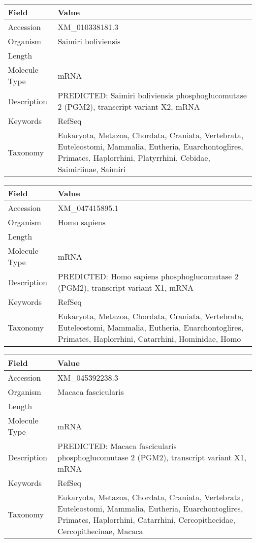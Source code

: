 \documentclass[10pt]{article}
\begin{document}
{\footnotesize
\begin{longtable}{>{\raggedright\arraybackslash}p{4.5cm} >{\raggedright\arraybackslash}p{11.5cm}}
\textbf{Field} & \textbf{Value} \\
\hline
Accession & XM\_010338181.3 \\
Organism & Saimiri boliviensis \\
Length & 2692 \\
Molecule Type & mRNA \\
Description & PREDICTED: Saimiri boliviensis phosphoglucomutase 2 (PGM2), transcript variant X2, mRNA \\
Keywords & RefSeq \\
Taxonomy & Eukaryota, Metazoa, Chordata, Craniata, Vertebrata, Euteleostomi, Mammalia, Eutheria, Euarchontoglires, Primates, Haplorrhini, Platyrrhini, Cebidae, Saimiriinae, Saimiri \\
\end{longtable}
}

{\footnotesize
\begin{longtable}{>{\raggedright\arraybackslash}p{4.5cm} >{\raggedright\arraybackslash}p{11.5cm}}
\textbf{Field} & \textbf{Value} \\
\hline
Accession & XM\_047415895.1 \\
Organism & Homo sapiens \\
Length & 2834 \\
Molecule Type & mRNA \\
Description & PREDICTED: Homo sapiens phosphoglucomutase 2 (PGM2), transcript variant X1, mRNA \\
Keywords & RefSeq \\
Taxonomy & Eukaryota, Metazoa, Chordata, Craniata, Vertebrata, Euteleostomi, Mammalia, Eutheria, Euarchontoglires, Primates, Haplorrhini, Catarrhini, Hominidae, Homo \\
\end{longtable}
}

{\footnotesize
\begin{longtable}{>{\raggedright\arraybackslash}p{4.5cm} >{\raggedright\arraybackslash}p{11.5cm}}
\textbf{Field} & \textbf{Value} \\
\hline
Accession & XM\_045392238.3 \\
Organism & Macaca fascicularis \\
Length & 2381 \\
Molecule Type & mRNA \\
Description & PREDICTED: Macaca fascicularis phosphoglucomutase 2 (PGM2), transcript variant X1, mRNA \\
Keywords & RefSeq \\
Taxonomy & Eukaryota, Metazoa, Chordata, Craniata, Vertebrata, Euteleostomi, Mammalia, Eutheria, Euarchontoglires, Primates, Haplorrhini, Catarrhini, Cercopithecidae, Cercopithecinae, Macaca \\
\end{longtable}
}
\end{document}
